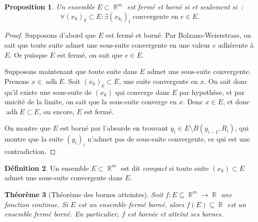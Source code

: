 \documentclass{article}
\DeclareMathOperator{\R}{\mathbb R}
\DeclareMathOperator{\adh}{adh}
\newcommand{\frmr}[2]{#1 : #2 \subseteq \R^m \to \R}
\newtheorem{thm}{Théorème}[section]
\newtheorem{prp}[thm]{Proposition}
\theoremstyle{definition}
\newtheorem{déf}[thm]{Définition}
\theoremstyle{remark}
\begin{document}
		\begin{prp} Un ensemble $E \subset \R^m$ est fermé et borné si et seulement si~:
		\[\forall (x_k)_k \subset E : \exists (x_{k_l})_l \text{ convergente en }e \in E.\]
		\end{prp}

		\begin{proof} Supposons d'abord que $E$ est fermé et borné. Par Bolzano-Weierstrass, on sait que toute suite admet une sous-suite convergente en une
		valeur $e$ adhérente à $E$. Or puisque $E$ est fermé, on sait que $e \in E$.

		Supposons maintenant que toute suite dans $E$ admet une sous-suite convergente. Prenons $x \in \adh E$. Soit $(x_k)_k \subset E$, une suite convergente
		en $x$. On sait donc qu'il existe une sous-suite de $(x_k)$ qui converge dans $E$ par hypothèse, et par unicité de la limite, on sait que la sous-suite
		converge en $x$. Donc $x \in E$, et donc $\adh E \subset E$, ou encore, $E$ est fermé.

		On montre que $E$ est borné par l'absurde en trouvant $y_i \in E \setminus B(y_{i-1}, R_i)$, qui montre que la suite $(y_i)_i$ n'admet pas de sous-suite
		convergente, ce qui est une contradiction.
		\end{proof}

		\begin{déf} Un ensemble $E \subset \R^m$ est dit \emph{compact} si toute suite $(x_k) \subset E$ admet une sous-suite convergente dans $E$. \end{déf}

		\begin{thm}[Théorème des bornes atteintes]\label{thm:bornesatteintesrn} Soit $\frmr fE$ une fonction continue. Si $E$ est un ensemble fermé borné,
		alors $f(E) \subseteq \R$ est un ensemble fermé borné. En particulier, $f$ est bornée et atteint ses bornes.
		\end{thm}
\end{document}
